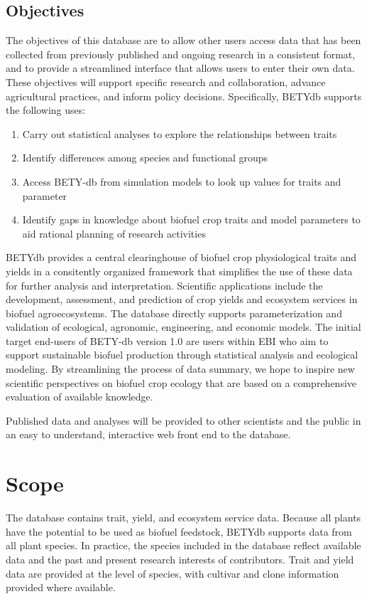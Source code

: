 \documentclass[10pt]{article}
\begin{document}
\subsection{Objectives}

 The objectives of this database are to allow other users access data that has been collected from previously published and ongoing research in a consistent format, and to provide a streamlined interface that allows users to enter their own data.
 These objectives will support specific research and collaboration, advance agricultural practices, and inform policy decisions.
 Specifically, BETYdb supports the following uses:

\begin{enumerate}
\item Carry out statistical analyses to explore the relationships between traits
\item Identify differences among species and functional groups
\item Access BETY-db from simulation models to look up values for traits and parameter
\item Identify gaps in knowledge about biofuel crop traits and model parameters to aid rational planning of research activities
\end{enumerate}

 BETYdb provides a central clearinghouse of biofuel crop physiological traits and yields in a consitently organized framework that simplifies the use of these data for further analysis and interpretation.
 Scientific applications include the development, assessment, and prediction of crop yields and ecosystem services in biofuel agroecosystems. 
 The database directly supports parameterization and validation of ecological, agronomic, engineering, and economic models.
 The initial target end-users of BETY-db version 1.0 are users within EBI who aim to support sustainable biofuel production through statistical analysis and ecological modeling.
 By streamlining the process of data summary, we hope to inspire new scientific perspectives on biofuel crop ecology that are based on a comprehensive evaluation of available knowledge.

 Published data and analyses will be provided to other scientists and the public in an easy to understand, interactive web front end to the database.

\section{Scope}
 The database contains trait, yield, and ecosystem service data.
 Because all plants have the potential to be used as biofuel feedstock, BETYdb supports data from all plant species.
 In practice, the species included in the database reflect available data and the past and present research interests of contributors.
 Trait and yield data are provided at the level of species, with cultivar and clone information provided where available.
\end{document}
